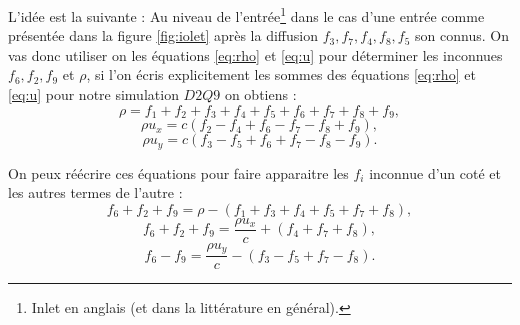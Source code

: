     L'idée est la suivante :
    Au niveau de l'entrée\footnote{Inlet en anglais (et dans la littérature en général).} dans le cas d'une entrée comme
    présentée dans la figure \ref{fig:iolet} après la diffusion $f_3, f_7, f_4, f_8, f_5$ son connus.
    On vas donc utiliser on les équations \ref{eq:rho} et \ref{eq:u} pour déterminer les inconnues $f_6, f_2, f_9$ et 
    $\rho$, si l'on écris explicitement les sommes des équations \ref{eq:rho} et \ref{eq:u} pour notre simulation $D2Q9$ 
    on obtiens :
    $$
      \rho = f_1 + f_2 + f_3 + f_4 + f_5 + f_6 + f_7 + f_8 + f_9,
    $$
    $$
      \rho u_x = c(f_2 - f_4 + f_6 - f_7 - f_8 + f_9),
    $$
    $$
      \rho u_y = c(f_3 - f_5 + f_6 + f_7 - f_8 - f_9).
    $$
     
    On peux réécrire ces équations pour faire apparaitre les $f_i$ inconnue d'un coté et les autres termes de l'autre :
    \begin{equation} \label{eq:zhrho}
      f_6 + f_2 + f_9 = \rho - (f_1 + f_3 + f_4 + f_5 + f_7 + f_8),
    \end{equation}      
    \begin{equation} \label{eq:zhux}
      f_6 + f_2 + f_9 = \frac{\rho u_x}{c} + ( f_4 + f_7 + f_8),
    \end{equation}
    \begin{equation} \label{eq:zhuy}
      f_6 - f_9 = \frac{\rho u_y}{c} - (f_3 - f_5 + f_7 - f_8).
    \end{equation}
    
